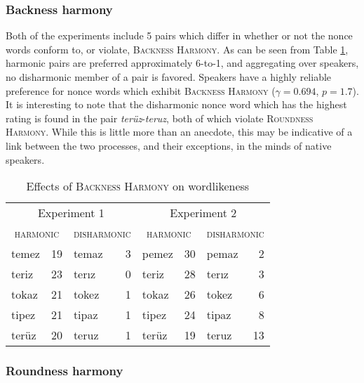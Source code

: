 \subsubsection{Backness harmony}

Both of the \citet{Zimmer1969} experiments include 5 pairs which differ in whether or not the nonce words conform to, or violate, \textsc{Backness Harmony}. 
As can be seen from Table \ref{bhw}, harmonic pairs are preferred approximately 6-to-1, and aggregating over speakers, no disharmonic member of a pair is favored. 
Speakers have a highly reliable preference for nonce words which exhibit \textsc{Backness Harmony} ($\gamma = 0.694$, $p = 1.7$). 
It is interesting to note that the disharmonic nonce word which has the highest rating is found in the pair \emph{terüz}-\emph{teruz}, both of which violate \textsc{Roundness Harmony}. 
While this is little more than an anecdote, this may be  indicative of a link between the two processes, and their exceptions, in the minds of native speakers. 

\begin{table}[t]
\centering
\begin{tabular}{lrlr|lrlr}
\toprule
\multicolumn{4}{c|}{Experiment 1} & \multicolumn{4}{c}{Experiment 2} \\
\multicolumn{2}{c}{\textsc{harmonic}} & \multicolumn{2}{c|}{\textsc{disharmonic}} & \multicolumn{2}{c}{\textsc{harmonic}} & \multicolumn{2}{c}{\textsc{disharmonic}} \\
\midrule
{temez} & 19            & {temaz} & 3 & {pemez} & 30            & {pemaz} & 2 \\
{teriz} & 23            & {terız} & 0 & {teriz} & 28            & {terız} & 3 \\
{tokaz} & 21            & {tokez} & 1 & {tokaz} & 26            & {tokez} & 6 \\
{tipez} & 21            & {tipaz} & 1 & {tipez} & 24            & {tipaz} & 8 \\
{terüz} & 20            & {teruz} & 1 & {terüz} & 19            & {teruz} & 13 \\
\bottomrule
\end{tabular}
\caption{Effects of \textsc{Backness Harmony} on wordlikeness \citep[from][]{Zimmer1969}}
\label{bhw}
\end{table}

\subsubsection{Roundness harmony}

